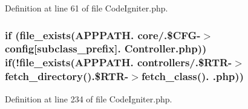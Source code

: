 Definition at line 61 of file Code\+Igniter.\+php.

\subsubsection[{\texorpdfstring{if}{if}}]{\setlength{\rightskip}{0pt plus 5cm}if (file\+\_\+exists(A\+P\+P\+P\+A\+T\+H. \textquotesingle{}core/\textquotesingle{}.\$C\+FG-\/$>$config\mbox{[}\textquotesingle{}subclass\+\_\+prefix\textquotesingle{}\mbox{]}. \textquotesingle{}Controller.\+php\textquotesingle{})) if(!file\+\_\+exists(A\+P\+P\+P\+A\+T\+H. \textquotesingle{}controllers/\textquotesingle{}.\$R\+TR-\/$>$fetch\+\_\+directory().\$R\+TR-\/$>$fetch\+\_\+class(). \textquotesingle{}.php\textquotesingle{}))}\hypertarget{_code_igniter_8php_acb2d2139729c1fd003d2184b034d9cf9}{}\label{_code_igniter_8php_acb2d2139729c1fd003d2184b034d9cf9}


Definition at line 234 of file Code\+Igniter.\+php.

